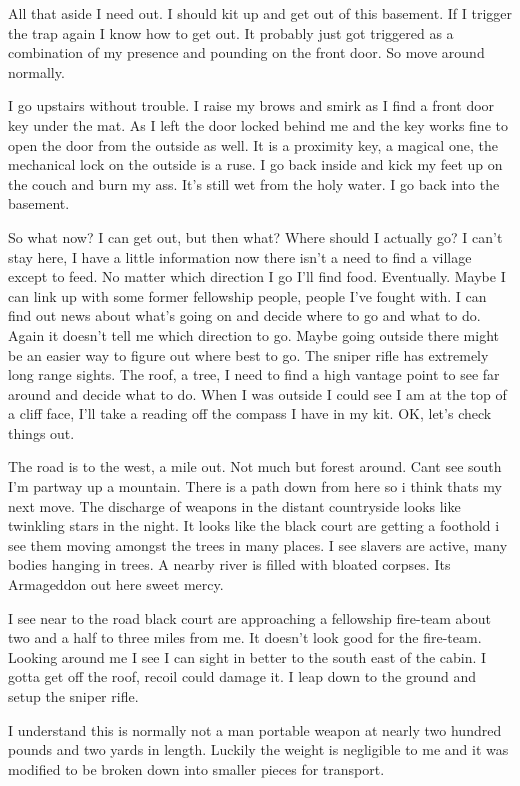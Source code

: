 All that aside I need out. I should kit up and get out of this basement. If I trigger the trap again I know how to get out. It probably just got triggered as a combination of my presence and pounding on the front door. So move around normally.

I go upstairs without trouble. I raise my brows and smirk as I find a front door key under the mat. As I left the door locked behind me and the key works fine to open the door from the outside as well. It is a proximity key, a magical one, the mechanical lock on the outside is a ruse. I go back inside and kick my feet up on the couch and burn my ass. It's still wet from the holy water. I go back into the basement.

So what now? I can get out, but then what? Where should I actually go? I can't stay here, I have a little information now there isn't a need to find a village except to feed. No matter which direction I go I'll find food. Eventually. Maybe I can link up with some former fellowship people, people I've fought with. I can find out news about what's going on and decide where to go and what to do. Again it doesn't tell me which direction to go. Maybe going outside there might be an easier way to figure out where best to go. The sniper rifle has extremely long range sights. The roof, a tree, I need to find a high vantage point to see far around and decide what to do. When I was outside I could see I am at the top of a cliff face, I'll take a reading off the compass I have in my kit. OK, let's check things out.

The road is to the west, a mile out. Not much but forest around. Cant see south I'm partway up a mountain. There is a path down from here so i think thats my next move. The discharge of weapons in the distant countryside looks like twinkling stars in the night. It looks like the black court are getting a foothold i see them moving amongst the trees in many places. I see slavers are active, many bodies hanging in trees. A nearby river is filled with bloated corpses. Its Armageddon out here sweet mercy.

I see near to the road black court are approaching a fellowship fire-team about two and a half to three miles from me. It doesn't look good for the fire-team. Looking around me I see I can sight in better to the south east of the cabin. I gotta get off the roof, recoil could damage it. I leap down to the ground and setup the sniper rifle. 

I understand this is normally not a man portable weapon at nearly two hundred pounds and two yards in length. Luckily the weight is negligible to me and it was modified to be broken down into smaller pieces for transport.

